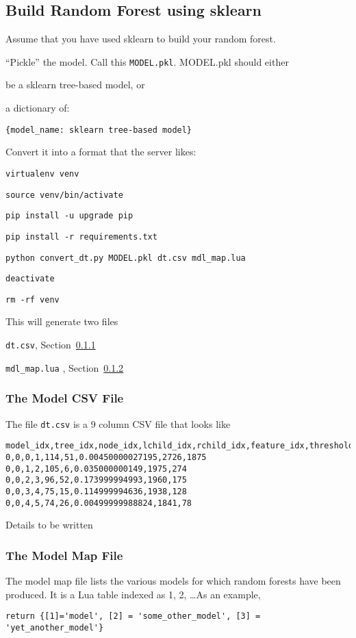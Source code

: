 \subsection{Build Random Forest using sklearn}
Assume that you have used sklearn to build your random forest.
\be
\item ``Pickle'' the model. Call this {\tt MODEL.pkl}.  MODEL.pkl should 
either 
\be
\item be a sklearn tree-based model, or 
\item a dictionary of: \begin{verbatim}
{model_name: sklearn tree-based model}
\end{verbatim}
\ee
\item Convert it into a format that the server likes:
\be
\item \verb+virtualenv venv+
\item \verb+source venv/bin/activate+
\item \verb+pip install -u upgrade pip+
\item \verb+pip install -r requirements.txt+
\item \verb+python convert_dt.py MODEL.pkl dt.csv mdl_map.lua+
\item \verb+deactivate+
\item \verb+rm -rf venv+
\ee
\ee

This will generate two files
\be
\item \verb+dt.csv+, Section~\ref{dt_csv}
\item \verb+mdl_map.lua+ , Section~\ref{mdl_map}
\ee

\subsubsection{The Model CSV File}
\label{dt_csv}
The file \verb+dt.csv+ is a 9 column CSV file that looks like
\begin{verbatim}
model_idx,tree_idx,node_idx,lchild_idx,rchild_idx,feature_idx,threshold,neg,pos
0,0,0,1,114,51,0.00450000027195,2726,1875
0,0,1,2,105,6,0.035000000149,1975,274
0,0,2,3,96,52,0.173999994993,1960,175
0,0,3,4,75,15,0.114999994636,1938,128
0,0,4,5,74,26,0.00499999988824,1841,78
\end{verbatim}

Details to be written \TBC

\subsubsection{The Model Map File}
\label{mdl_map}
The model map file lists the various models for which random forests 
have been produced. It is a Lua table indexed as 1, 2, \ldots As an example,
\begin{verbatim}
return {[1]='model', [2] = 'some_other_model', [3] = 'yet_another_model'}
\end{verbatim}


